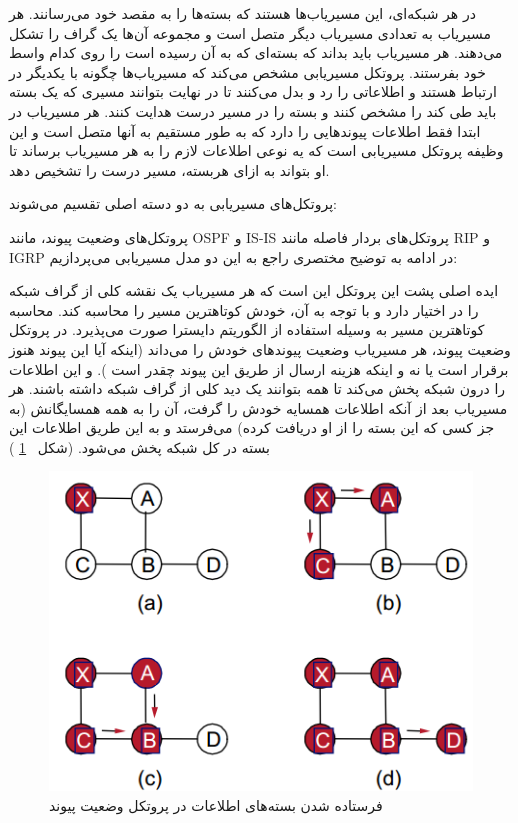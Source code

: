 
در هر شبکه‌ای، این مسیریاب‌ها هستند که بسته‌ها را به مقصد خود می‌رسانند. هر مسیریاب به تعدادی مسیریاب دیگر متصل است و مجموعه آن‌ها یک گراف را تشکل می‌دهند. هر مسیریاب باید بداند که بسته‌ای که به آن رسیده است را روی کدام واسط خود بفرستند. 
پروتکل مسیریابی مشخص می‌کند که مسیریاب‌ها چگونه با یکدیگر در ارتباط‌‌ هستند و اطلاعاتی را رد و بدل می‌کنند تا در نهایت بتوانند مسیری که یک بسته باید طی کند را مشخص کنند و بسته را در مسیر درست هدایت کنند. هر مسیریاب در ابتدا فقط اطلاعات پیوندهایی را دارد که به طور مستقیم به آنها متصل است و این وظیفه پروتکل مسیریابی است که یه نوعی اطلاعات لازم را به هر مسیریاب برساند تا او بتواند به ازای هربسته، مسیر درست را تشخیص دهد. 

پروتکل‌های مسیریابی به دو دسته اصلی تقسیم می‌شوند:‌

 پروتکل‌های وضعیت پیوند، مانند OSPF
و
 IS-IS
 پروتکل‌های بردار فاصله مانند RIP
و IGRP
 در ادامه به توضیح مختصری راجع به این دو مدل مسیریابی می‌پردازیم:
 
 ایده اصلی پشت این پروتکل این است که هر مسیریاب یک نقشه کلی از گراف شبکه را در اختیار دارد و با توجه به آن، خودش کوتاهترین مسیر را محاسبه کند. محاسبه کوتاهترین مسیر به وسیله استفاده از الگوریتم دایسترا صورت می‌پذیرد. در پروتکل وضعیت پیوند، هر مسیریاب وضعیت پیوند‌های خودش را می‌داند (‌اینکه آیا این پیوند هنوز برقرار است یا نه و اینکه هزینه ارسال از طریق این پیوند چقدر است ). و این اطلاعات را درون شبکه پخش می‌کند تا همه بتوانند یک دید کلی از گراف شبکه داشته باشند. هر مسیریاب بعد از آنکه اطلاعات همسایه خودش را گرفت، آن را به همه همسایگانش (‌به جز کسی که این بسته را از او دریافت کرده)‌ می‌فرستد و به این طریق اطلاعات این بسته در کل شبکه پخش می‌شود. (‌شکل 
~\ref{fig:linkstate}
 )
 \begin{figure}[H]
\centering
\includegraphics[scale=0.8]{./resources/figures/linkstate.png}
\caption{فرستاده شدن بسته‌‌های اطلاعات در پروتکل وضعیت پیوند}
\label{fig:linkstate}
\end{figure}
 
